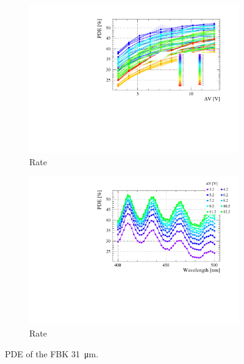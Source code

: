 \begin{landscape}
\begin{figure}[htbp]
\begin{subfigure}{0.65\textwidth}
        \includegraphics[width=\linewidth]{gfx/plots/PDE/31/c_Freq_Bias.pdf}    
        \caption{Rate}
    \end{subfigure}
    \begin{subfigure}{0.65\textwidth}
        \includegraphics[width=\linewidth]{gfx/plots/PDE/31/c_Freq_Wavelength.pdf} 
        \caption{Rate}
    \end{subfigure}
    \caption{PDE of the FBK \SI{31}{\micro m}.}
    \label{fig:pde 31um}
\end{figure}
\end{landscape}

